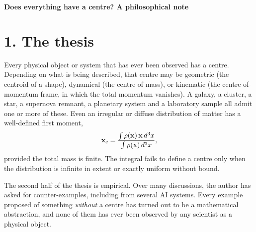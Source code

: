 \documentclass[11pt,a4paper]{article}
\begin{document}
\setcounter{page}{104}
\pagestyle{plain}
\begin{center}{\Large\bfseries Does everything have a centre? A philosophical note\par}\end{center}
\section*{1. The thesis}
Every physical object or system that has ever been observed has a centre. Depending on what is being described, that centre may be geometric (the centroid of a shape), dynamical (the centre of mass), or kinematic (the centre-of-momentum frame, in which the total momentum vanishes). A galaxy, a cluster, a star, a supernova remnant, a planetary system and a laboratory sample all admit one or more of these. Even an irregular or diffuse distribution of matter has a well-defined first moment,
\begin{equation}
\mathbf{x}_{\rm c}=\frac{\int\rho(\mathbf{x})\,\mathbf{x}\,d^3x}{\int\rho(\mathbf{x})\,d^3x},
\end{equation}
provided the total mass is finite. The integral fails to define a centre only when the distribution is infinite in extent or exactly uniform without bound.

The second half of the thesis is empirical. Over many discussions, the author has asked for counter-examples, including from several AI systems. Every example proposed of something \emph{without} a centre has turned out to be a mathematical abstraction, and none of them has ever been observed by any scientist as a physical object.
\end{document}

